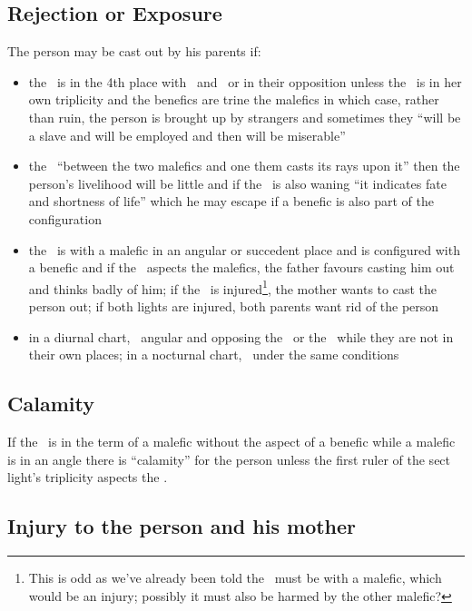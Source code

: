 \subsection{Rejection or Exposure}
The person may be cast out by his parents if:
\begin{itemize}
\item the \Moon\, is in the 4th place with \Saturn\, and \Mars\, or in their opposition unless the \Moon\, is in her own triplicity and the benefics are trine the malefics in which case, rather than ruin, the person is brought up by strangers and sometimes they ``will be a slave and will be employed and then will be miserable''

\item the \Moon\, ``between the two malefics and one them casts its rays upon it'' then the person's livelihood will be little and if the \Moon\, is also waning ``it indicates fate and shortness of life'' which he may escape if a benefic is also part of the configuration

\item the \Moon\, is with a malefic in an angular or succedent place and is configured with a benefic and if the \Sun\, aspects the malefics, the father favours casting him out and thinks badly of him; if the \Moon\, is injured\footnote{This is odd as we've already been told the \Moon\, must be with a malefic, which would be an injury; possibly it must also be harmed by the other malefic?}, the mother wants to cast the person out; if both lights are injured, both parents want rid of the person

\item in a diurnal chart, \Mars\, angular and opposing the \Moon\, or the \Sun\, while they are not in their own places; in a nocturnal chart, \Saturn\, under the same conditions
\end{itemize}

\subsection{Calamity}

If the \Moon\, is in the term of a malefic without the aspect of a benefic while a malefic is in an angle there is ``calamity'' for the person unless the first ruler of the sect light's triplicity aspects the \Moon.

\subsection{Injury to the person and his mother}

